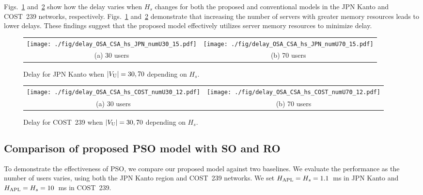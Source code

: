 \documentclass[10pt, letterpaper]{IEEEtran}
\begin{document}
\begin{CJK}{UTF8}{ipxm}
Figs.~\ref{fig:delay_OSA_CSA_hs_JPN} and~\ref{fig:delay_OSA_CSA_hs_COST} show how the delay varies when $H_s$ changes for both the proposed and conventional models in the JPN Kanto and COST~239 networks, respectively.
Figs.~\ref{fig:delay_OSA_CSA_hs_JPN} and~\ref{fig:delay_OSA_CSA_hs_COST} demonstrate that increasing the number of servers with greater memory resources leads to lower delays. 
These findings suggest that the proposed model effectively utilizes server memory resources to minimize delay.
\begin{figure}[t]
  \begin{center}
      \begin{tabular}{cc}
      \texttt{[image: ./fig/delay\_OSA\_CSA\_hs\_JPN\_numU30\_15.pdf]} &
      \texttt{[image: ./fig/delay\_OSA\_CSA\_hs\_JPN\_numU70\_15.pdf]} \\
      (a) 30 users & (b) 70 users
      \end{tabular}
  \end{center}
  \caption{Delay for JPN Kanto when $|V_{\rm U}| = 30, 70$ depending on $H_s$.}
  \label{fig:delay_OSA_CSA_hs_JPN}
\end{figure}
\begin{figure}[t]
  \begin{center}
      \begin{tabular}{cc}
      \texttt{[image: ./fig/delay\_OSA\_CSA\_hs\_COST\_numU30\_12.pdf]} &
      \texttt{[image: ./fig/delay\_OSA\_CSA\_hs\_COST\_numU70\_12.pdf]} \\
      (a) 30 users & (b) 70 users
      \end{tabular}
  \end{center}
  \caption{Delay for COST~239 when $|V_{\rm U}| = 30, 70$ depending on $H_s$.}
  \label{fig:delay_OSA_CSA_hs_COST}
\end{figure}

\subsection{Comparison of proposed PSO model with SO and RO}
To demonstrate the effectiveness of PSO, we compare our proposed model against two baselines.
We evaluate the performance as the number of users varies, using both the JPN Kanto region and COST~239 networks.
We set $H_{\rm APL} = H_s = 1.1$~ms in JPN Kanto and $H_{\rm APL} = H_s = 10$~ms in COST~239.


\end{CJK}
\end{document}
